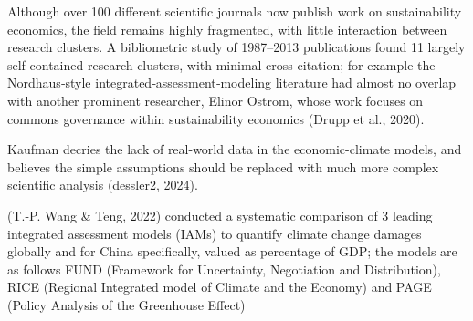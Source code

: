 \documentclass[
  12pt,
  letterpaper,
  DIV=11,
  numbers=noendperiod]{scrartcl}
\begin{document}
Although over 100 different scientific journals now publish work on
sustainability economics, the field remains highly fragmented, with
little interaction between research clusters. A bibliometric study of
1987--2013 publications found 11 largely self‑contained research
clusters, with minimal cross‑citation; for example the Nordhaus‑style
integrated‑assessment‑modeling literature had almost no overlap with
another prominent researcher, Elinor Ostrom, whose work focuses on
commons governance within sustainability economics (Drupp et al., 2020).

Kaufman decries the lack of real-world data in the economic-climate
models, and believes the simple assumptions should be replaced with much
more complex scientific analysis (dessler2, 2024).

(T.-P. Wang \& Teng, 2022) conducted a systematic comparison of 3
leading integrated assessment models (IAMs) to quantify climate change
damages globally and for China specifically, valued as percentage of
GDP; the models are as follows FUND (Framework for Uncertainty,
Negotiation and Distribution), RICE (Regional Integrated model of
Climate and the Economy) and PAGE (Policy Analysis of the Greenhouse
Effect)

\def\pandoctableshortcapt{Integrated Assessment Models: Quantifying
Climate Damage Scenarios}
\end{document}
